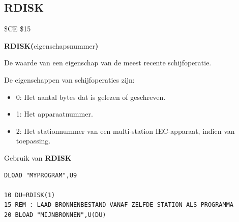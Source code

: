 \subsection{RDISK}
\begin{description}[leftmargin=2cm,style=nextline]
\item [Token:]    \$CE \$15

\item [Formaat:]   {\bf RDISK(}eigenschapsnummer{\bf)}

\item [Retourneert:]  De waarde van een eigenschap van de meest recente schijfoperatie.

                  De eigenschappen van schijfoperaties zijn:
                  \begin{itemize}
                     \item 0: Het aantal bytes dat is gelezen of geschreven.                     \item 1: Het apparaatnummer.                     \item 2: Het stationnummer van een multi-station IEC-apparaat, indien van toepassing.
                  \end{itemize}

\item [Voorbeeld:]  Gebruik van {\bf RDISK}

\begin{tcolorbox}[colback=black,coltext=white]
\verbatimfont{\codefont}
\begin{verbatim}
DLOAD "MYPROGRAM",U9

10 DU=RDISK(1)
15 REM : LAAD BRONNENBESTAND VANAF ZELFDE STATION ALS PROGRAMMA
20 BLOAD "MIJNBRONNEN",U(DU)
\end{verbatim}
\end{tcolorbox}
\end{description}



\newpage
